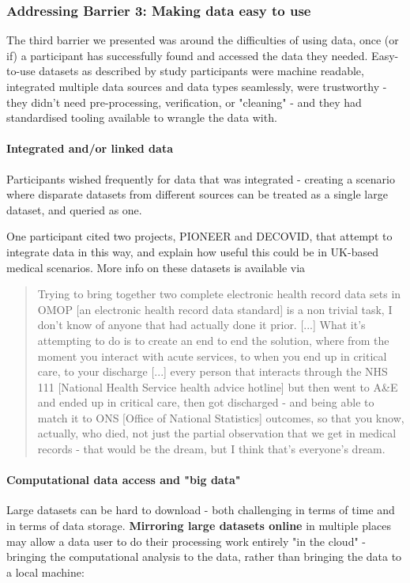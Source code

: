 \documentclass{CUP-JNL-DAP}%
\begin{document}
\subsubsection{Addressing Barrier 3: Making data easy to use} 
The third barrier we presented was around the difficulties of using data, once (or if) a participant has successfully found and accessed the data they needed. Easy-to-use datasets as described by study participants were machine readable, integrated multiple data sources and data types seamlessly, were trustworthy - they didn't need pre-processing, verification, or "cleaning" - and they had standardised tooling available to wrangle the data with.

\paragraph{Integrated and/or linked data}
Participants wished frequently for data that was integrated - creating a scenario where disparate datasets from different sources can be treated as a single large dataset, and queried as one. 

One participant cited two projects, PIONEER and DECOVID, that attempt to integrate data in this way, and explain how useful this could be in UK-based medical scenarios. More info on these datasets is available via \cite{pioneer}

\blockquote{Trying to bring together two complete electronic health record data sets in OMOP [an electronic health record data standard] is a non trivial task, I don't know of anyone that had actually done it prior. [...] What it's attempting to do is to create an end to end the solution, where from the moment you interact with acute services, to when you end up in critical care, to your discharge [...] every person that interacts through the NHS 111 [National Health Service health advice hotline] but then went to A\&E and ended up in critical care, then got discharged - and being able to match it to ONS [Office of National Statistics] outcomes, so that you know, actually, who died, not just the partial observation that we get in medical records - that would be the dream, but I think that's everyone's dream.}

\paragraph{Computational data access and "big data"}
 Large datasets can be hard to download - both challenging in terms of time and in terms of data storage. \textbf{Mirroring large datasets online} in multiple places may allow a data user to do their processing work entirely "in the cloud" - bringing the computational analysis to the data, rather than bringing the data to a local machine: 
\end{document}
